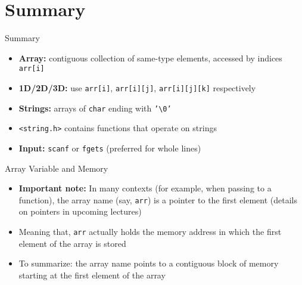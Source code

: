 \documentclass[12pt, aspectratio=169]{beamer}
\begin{document}





    \section{Summary}


    \begin{frame}{Summary}
        \begin{itemize}
            \item \textbf{Array:} contiguous collection of same-type elements, accessed by indices \texttt{arr[i]}
            \item \textbf{1D/2D/3D:} use \texttt{arr[i]}, \texttt{arr[i][j]}, \texttt{arr[i][j][k]} respectively
            \item \textbf{Strings:} arrays of \texttt{char} ending with \texttt{'\textbackslash0'}
            \item \texttt{<string.h>} contains functions that operate on strings
            \item \textbf{Input:} \texttt{scanf} or \texttt{fgets} (preferred for whole lines)
        \end{itemize}
    \end{frame}


    \begin{frame}{Array Variable and Memory}
        \begin{itemize}
            \item \textbf{Important note:} In many contexts (for example, when passing to a function), the array name (say, \texttt{arr}) is a pointer to the first element (details on pointers in upcoming lectures)
            \item Meaning that, \texttt{arr} actually holds the memory address in which the first element of the array is stored
            \item To summarize: the array name points to a contiguous block of memory starting at the first element of the array
        \end{itemize}
    \end{frame}
\end{document}
